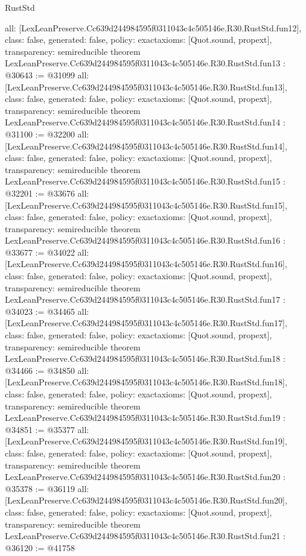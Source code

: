 \begin{lexlean}{RustStd}
\begin{coremodule}
{  all: [LexLeanPreserve.Cc639d244984595f0311043c4c505146e.R30.RustStd.fun12],
  class: false,
  generated: false,
  policy: exact{axioms: [Quot.sound, propext]},
  transparency: semireducible
}
theorem LexLeanPreserve.Cc639d244984595f0311043c4c505146e.R30.RustStd.fun13 : @30643 := @31099 {
  all: [LexLeanPreserve.Cc639d244984595f0311043c4c505146e.R30.RustStd.fun13],
  class: false,
  generated: false,
  policy: exact{axioms: [Quot.sound, propext]},
  transparency: semireducible
}
theorem LexLeanPreserve.Cc639d244984595f0311043c4c505146e.R30.RustStd.fun14 : @31100 := @32200 {
  all: [LexLeanPreserve.Cc639d244984595f0311043c4c505146e.R30.RustStd.fun14],
  class: false,
  generated: false,
  policy: exact{axioms: [Quot.sound, propext]},
  transparency: semireducible
}
theorem LexLeanPreserve.Cc639d244984595f0311043c4c505146e.R30.RustStd.fun15 : @32201 := @33676 {
  all: [LexLeanPreserve.Cc639d244984595f0311043c4c505146e.R30.RustStd.fun15],
  class: false,
  generated: false,
  policy: exact{axioms: [Quot.sound, propext]},
  transparency: semireducible
}
theorem LexLeanPreserve.Cc639d244984595f0311043c4c505146e.R30.RustStd.fun16 : @33677 := @34022 {
  all: [LexLeanPreserve.Cc639d244984595f0311043c4c505146e.R30.RustStd.fun16],
  class: false,
  generated: false,
  policy: exact{axioms: [Quot.sound, propext]},
  transparency: semireducible
}
theorem LexLeanPreserve.Cc639d244984595f0311043c4c505146e.R30.RustStd.fun17 : @34023 := @34465 {
  all: [LexLeanPreserve.Cc639d244984595f0311043c4c505146e.R30.RustStd.fun17],
  class: false,
  generated: false,
  policy: exact{axioms: [Quot.sound, propext]},
  transparency: semireducible
}
theorem LexLeanPreserve.Cc639d244984595f0311043c4c505146e.R30.RustStd.fun18 : @34466 := @34850 {
  all: [LexLeanPreserve.Cc639d244984595f0311043c4c505146e.R30.RustStd.fun18],
  class: false,
  generated: false,
  policy: exact{axioms: [Quot.sound, propext]},
  transparency: semireducible
}
theorem LexLeanPreserve.Cc639d244984595f0311043c4c505146e.R30.RustStd.fun19 : @34851 := @35377 {
  all: [LexLeanPreserve.Cc639d244984595f0311043c4c505146e.R30.RustStd.fun19],
  class: false,
  generated: false,
  policy: exact{axioms: [Quot.sound, propext]},
  transparency: semireducible
}
theorem LexLeanPreserve.Cc639d244984595f0311043c4c505146e.R30.RustStd.fun20 : @35378 := @36119 {
  all: [LexLeanPreserve.Cc639d244984595f0311043c4c505146e.R30.RustStd.fun20],
  class: false,
  generated: false,
  policy: exact{axioms: [Quot.sound, propext]},
  transparency: semireducible
}
theorem LexLeanPreserve.Cc639d244984595f0311043c4c505146e.R30.RustStd.fun21 : @36120 := @41758 {
}
\end{coremodule}
\end{lexlean}

